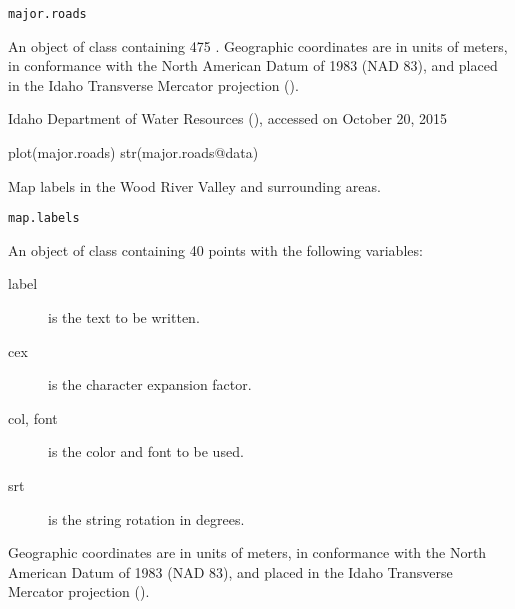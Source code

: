 \documentclass[a4paper]{book}
\begin{document}
%
\begin{Usage}
\begin{verbatim}
major.roads
\end{verbatim}
\end{Usage}
%
\begin{Format}
An object of  class containing 475 .
Geographic coordinates are in units of meters, in conformance with the North American Datum of 1983 (NAD 83), and placed in the
Idaho Transverse Mercator projection ().
\end{Format}
%
\begin{Source}\relax
Idaho Department of Water Resources (), accessed on October 20, 2015
\end{Source}
%
\begin{Examples}
\begin{ExampleCode}
plot(major.roads)
str(major.roads@data)
\end{ExampleCode}
\end{Examples}
%
\begin{Description}\relax
Map labels in the Wood River Valley and surrounding areas.
\end{Description}
%
\begin{Usage}
\begin{verbatim}
map.labels
\end{verbatim}
\end{Usage}
%
\begin{Format}
An object of  class containing 40 points with the following variables:
\begin{description}

\item[label] is the text to be written.
\item[cex] is the character expansion factor.
\item[col, font] is the color and font to be used.
\item[srt] is the string rotation in degrees.

\end{description}

Geographic coordinates are in units of meters, in conformance with the North American Datum of 1983 (NAD 83), and placed in the
Idaho Transverse Mercator projection ().
\end{Format}
\end{document}
